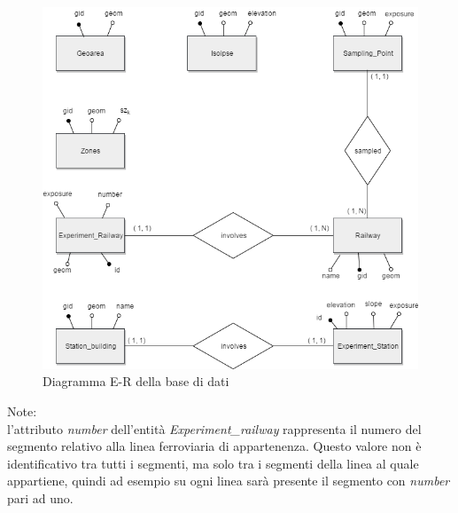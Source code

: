 \begin{figure}[h]
	\centering
	\includegraphics[width=1\textwidth]{img/er}
	\caption{Diagramma E-R della base di dati}
    \label{fig:er}
\end{figure}

Note:\\
l'attributo \textit{number} dell'entità \textit{Experiment\_railway}  rappresenta il numero del segmento relativo alla linea ferroviaria di appartenenza. Questo valore non è identificativo tra tutti i segmenti, ma solo tra i segmenti della linea al quale appartiene, quindi ad esempio su ogni linea sarà presente il segmento con \textit{number} pari ad uno.
\pagebreak

